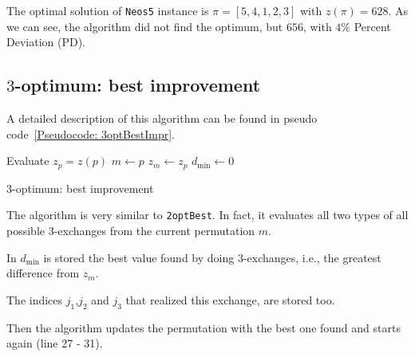 The optimal solution of \texttt{Neos5} instance is $\pi=[5,4,1,2,3]$ with $z(\pi)=628$.
As we can see, the algorithm did not find the optimum, but $656$, with $4\%$ Percent Deviation (PD). 


\subsection{$3$-optimum: best improvement}
A detailed description of this algorithm can be found in pseudo code~\ref{Pseudocode: 3optBestImpr}.

\begin{algorithm}
	Evaluate $z_p =z(p)$\;
	$m\gets p$\; 
	$z_m \gets z_p$\;
	 $d_\mathrm{min} \gets 0$\label{alg:majormejora}\;
	{
	}

	\caption{$3$-optimum: best improvement}
	\label{Pseudocode: 3optBestImpr}
\end{algorithm}

The algorithm is very similar to \texttt{2optBest}. In fact, it evaluates all two types of all possible $3$-exchanges from the current permutation $m$.

In $d_\mathrm{min}$ is stored the best value found by doing $3$-exchanges, i.e., the greatest difference from $z_m$. 

The indices  $j_1$,$j_2$ and $j_3$ that realized this exchange, are stored too. 

Then the algorithm updates the permutation with the best one found and starts again (line 27 - 31).

